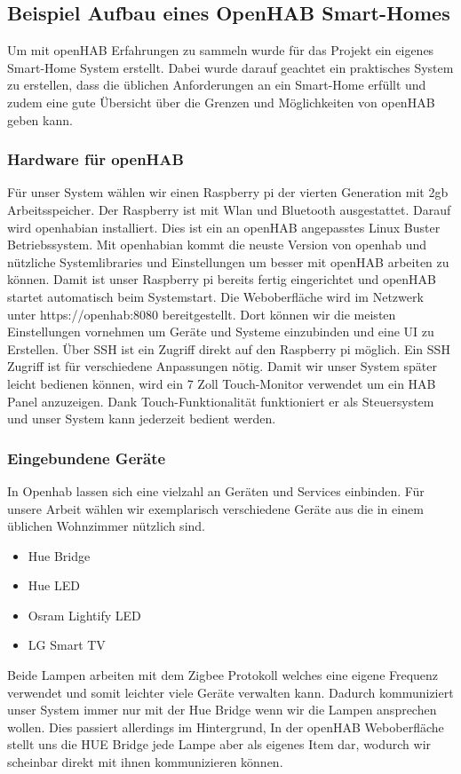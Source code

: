 \subsection{Beispiel Aufbau eines OpenHAB Smart-Homes}
	Um mit openHAB Erfahrungen zu sammeln wurde für das Projekt ein eigenes Smart-Home System erstellt. Dabei wurde darauf geachtet ein praktisches System zu erstellen, dass die üblichen Anforderungen an ein Smart-Home erfüllt und zudem eine gute Übersicht über die Grenzen und Möglichkeiten von openHAB geben kann.

	\subsubsection{Hardware für openHAB}
		Für unser System wählen wir einen Raspberry pi der vierten Generation mit 2gb Arbeitsspeicher. Der Raspberry ist mit Wlan und Bluetooth ausgestattet. Darauf wird openhabian installiert. Dies ist ein an openHAB angepasstes Linux Buster Betriebssystem. Mit openhabian kommt die neuste Version von openhab und nützliche Systemlibraries und Einstellungen um besser mit openHAB arbeiten zu können. Damit ist unser Raspberry pi bereits fertig eingerichtet und openHAB startet automatisch beim Systemstart. Die Weboberfläche wird im Netzwerk unter https://openhab:8080 bereitgestellt. Dort können wir die meisten Einstellungen vornehmen um Geräte und Systeme einzubinden und eine UI zu Erstellen. Über SSH ist ein Zugriff direkt auf den Raspberry pi möglich. Ein SSH Zugriff ist für verschiedene Anpassungen nötig.
		Damit wir unser System später leicht bedienen können, wird ein 7 Zoll Touch-Monitor verwendet um ein HAB Panel anzuzeigen. Dank Touch-Funktionalität funktioniert er als Steuersystem und unser System kann jederzeit bedient werden.
		
		
	\subsubsection{Eingebundene Geräte}
		In Openhab lassen sich eine vielzahl an Geräten und Services einbinden. Für unsere Arbeit wählen wir exemplarisch verschiedene Geräte aus die in einem üblichen Wohnzimmer nützlich sind.
		\begin{itemize}
			\item Hue Bridge
			\item  Hue LED
			\item Osram Lightify LED
			\item LG Smart TV
		\end{itemize}
		Beide Lampen arbeiten mit dem Zigbee Protokoll welches eine eigene Frequenz verwendet und somit leichter viele Geräte verwalten kann. Dadurch kommuniziert unser System immer nur mit der Hue Bridge wenn wir die Lampen ansprechen wollen. Dies passiert allerdings im Hintergrund, In der openHAB Weboberfläche stellt uns die HUE Bridge jede Lampe aber als eigenes Item dar, wodurch wir scheinbar direkt mit ihnen kommunizieren können.
		
